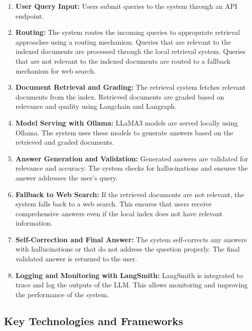 \begin{enumerate}
    \item \textbf{User Query Input:} Users submit queries to the system through an API endpoint.

    \item \textbf{Routing:} The system routes the incoming queries to appropriate retrieval approaches using a routing mechanism. Queries that are relevant to the indexed documents are processed through the local retrieval system. Queries that are not relevant to the indexed documents are routed to a fallback mechanism for web search.

    \item \textbf{Document Retrieval and Grading:} The retrieval system fetches relevant documents from the index. Retrieved documents are graded based on relevance and quality using Langchain and Langraph.

    \item \textbf{Model Serving with Ollama:} LLaMA3 models are served locally using Ollama. The system uses these models to generate answers based on the retrieved and graded documents.

    \item \textbf{Answer Generation and Validation:} Generated answers are validated for relevance and accuracy. The system checks for hallucinations and ensures the answer addresses the user's query.

    \item \textbf{Fallback to Web Search:} If the retrieved documents are not relevant, the system falls back to a web search. This ensures that users receive comprehensive answers even if the local index does not have relevant information.

    \item \textbf{Self-Correction and Final Answer:} The system self-corrects any answers with hallucinations or that do not address the question properly. The final validated answer is returned to the user.

    \item \textbf{Logging and Monitoring with LangSmith:} LangSmith is integrated to trace and log the outputs of the LLM. This allows monitoring and improving the performance of the system.

\end{enumerate}

\subsection{Key Technologies and Frameworks}

